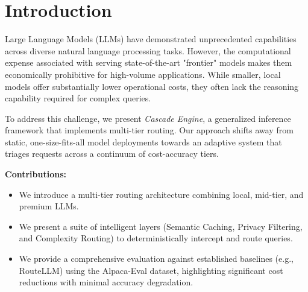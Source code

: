 \section{Introduction}

Large Language Models (LLMs) have demonstrated unprecedented capabilities across diverse natural language processing tasks. However, the computational expense associated with serving state-of-the-art "frontier" models makes them economically prohibitive for high-volume applications. While smaller, local models offer substantially lower operational costs, they often lack the reasoning capability required for complex queries.

To address this challenge, we present \textit{Cascade Engine}, a generalized inference framework that implements multi-tier routing. Our approach shifts away from static, one-size-fits-all model deployments towards an adaptive system that triages requests across a continuum of cost-accuracy tiers.

\textbf{Contributions:}
\begin{itemize}
    \item We introduce a multi-tier routing architecture combining local, mid-tier, and premium LLMs.
    \item We present a suite of intelligent layers (Semantic Caching, Privacy Filtering, and Complexity Routing) to deterministically intercept and route queries.
    \item We provide a comprehensive evaluation against established baselines (e.g., RouteLLM) using the Alpaca-Eval dataset, highlighting significant cost reductions with minimal accuracy degradation.
\end{itemize}
